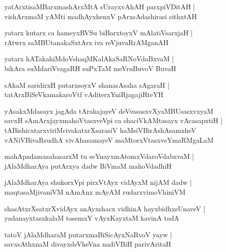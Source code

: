 \documentclass[twoside,12pt,openright]{book}
\newcounter{shloka}[chapter]
\begin{document}
\begin{shloka}%
yatArxtisaMBarxmashArxMtA sUrayxvAhAH parxpiVDitAH |\\
vishArxmaM yAMti madhAyxhenxV pArxsAdashirasi sithxtAH 
\end{shloka}

\begin{shloka}%
yatarx kutarx ca hameyxRVSu biBarxtoyxV mAlatiVsarxjaH |\\
rAtwrx saMBUtanakaSxtArx iva reVjuvaRrAMganAH 
\end{shloka}

\begin{shloka}%
yatarx hATakahiMdoVshaqMKalAkaSaRNoVdaBxvaM |\\
bikAra suMdariVvagaRH suPxTaM meVruBuvoV BuvaH 
\end{shloka}

\begin{shloka}%
sAkaM saridirxH putarxsoyxV shanasAsaha sAgaraH |\\
tatArxBiSeVkamakaroVtf vAditerxYniRjagajiRteYH
\end{shloka}

\begin{shloka}%
yAsakxMdasayx jagAda tArakajayeV deVvasasxvXyaMBUsasxvxyaM \\
savxH sAmArxjayxmahoVtasxveVpi ca shaciVkAMtasayx vAcasapxtiH |\\
tABishicxtarxviriMcivakatxrXsarasiV haMsiVBirAshAsamxheV\\
vANiVBivaRsudhA vivAhasamayeV maMtorxVtasxveYmaRMgaLaM  
\end{shloka}

\begin{shloka}%
mahApadamxsahasarxM tu seYnayxmAtomxVdaroVdabxvaM |\\
jAlaMdharAya putArxya dadw BiVmaM mahoVdadhiH
\end{shloka}

\begin{shloka}%
jAlaMdharAya shukorxVpi pirxVtAyx vidAyxM nijAM dadw |\\
maqtasaMjivaniVM nAmAnx mAyAM rudarxvimoVhiniVM 
\end{shloka}

\begin{shloka}%
shasAtxrXsatxrXvidAyx anAyxshacx vidhinA hayxbidhxsUnaveV |\\
yadanayxtasxkalaM tasemxY vAyxKayxtaM kavinA tadA 
\end{shloka}

\begin{shloka}%
tatoV jAlaMdharaM putarxmaBiSicAyxNaRvoV yayw |\\
savxsAthxnaM divayxdeVheVna nadiVBiH parivAritaH
\end{shloka}
\end{document}
